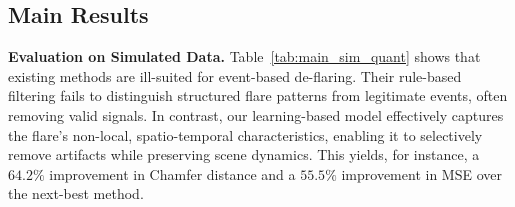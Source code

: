 \subsection{Main Results}
\label{sec:main_results}

\noindent\textbf{Evaluation on Simulated Data.}
Table~\ref{tab:main_sim_quant} shows that existing methods are ill-suited for event-based de-flaring. Their rule-based filtering fails to distinguish structured flare patterns from legitimate events, often removing valid signals. In contrast, our learning-based model effectively captures the flare's non-local, spatio-temporal characteristics, enabling it to selectively remove artifacts while preserving scene dynamics. This yields, for instance, a $\mathbf{64.2\%}$ improvement in Chamfer distance and a $\mathbf{55.5\%}$ improvement in MSE over the next-best method.



